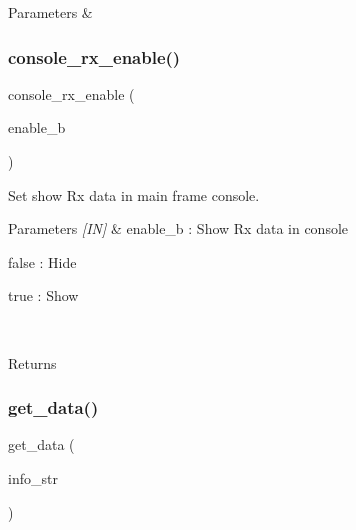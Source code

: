 \begin{DoxyParams}{Parameters}
{\em } & \\
\hline
\end{DoxyParams}
\mbox{\label{classmain__frame_ab2f41cb5c107ff572fd4cf2054593e85}} 
\subsubsection{console\_rx\_enable()}
{\footnotesize\ttfamily console\+\_\+rx\+\_\+enable (\begin{DoxyParamCaption}\item[{enable\+\_\+b}]{ }\end{DoxyParamCaption})}



Set show Rx data in main frame console. 


\begin{DoxyCode}{0}
\end{DoxyCode}



\begin{DoxyParams}{Parameters}
{\em \mbox{[}\+I\+N\mbox{]}} & enable\+\_\+b \+: Show Rx data in console \begin{DoxyItemize}
\item false \+: Hide \item true \+: Show \end{DoxyItemize}
\\
\hline
\end{DoxyParams}
\begin{DoxyReturn}{Returns}

\end{DoxyReturn}
\mbox{\label{classmain__frame_a1d5fe8687a955a4fc5f803dc47b644df}} 
\subsubsection{get\_data()}
{\footnotesize\ttfamily get\+\_\+data (\begin{DoxyParamCaption}\item[{info\+\_\+str}]{ }\end{DoxyParamCaption})}



